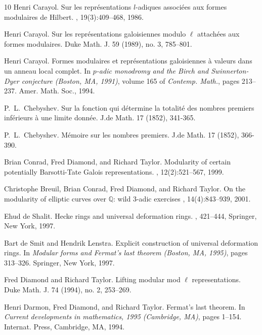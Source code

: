 \documentclass[12pt]{amsart}
\newcommand{\Q}{\mathbb{Q}}
\begin{document}
\begin{thebibliography}{10}
Henri Carayol.
\newblock Sur les repr\'esentations {$l$}-adiques associ\'ees aux formes
  modulaires de {H}ilbert.
, 19(3):409--468, 1986.

Henri Carayol.
\newblock Sur les représentations galoisiennes modulo $\ell$ attachées aux formes modulaires.   
\newblock Duke Math. J.  59  (1989),  no. 3, 785--801.

\bibitem{[C94]}
Henri Carayol.
\newblock Formes modulaires et repr\'esentations galoisiennes \`a valeurs dans
  un anneau local complet.
\newblock In {\em $p$-adic monodromy and the Birch and Swinnerton-Dyer
  conjecture (Boston, MA, 1991)}, volume 165 of {\em Contemp. Math.}, pages
  213--237. Amer. Math. Soc., 1994.


P.~L.~Chebyshev.
\newblock Sur la fonction qui d\'etermine la totalit\'e des nombres premiers inf\'erieurs \`a une limite donn\'ee.
\newblock J.de Math. 17 (1852), 341-365.

P.~L.~Chebyshev.
\newblock M\'emoire sur les nombres premiers.
\newblock J.de Math. 17 (1852), 366-390.


Brian Conrad, Fred Diamond, and Richard Taylor.
\newblock Modularity of certain potentially {B}arsotti-{T}ate {G}alois
  representations.
, 12(2):521--567, 1999.

Christophe Breuil, Brian Conrad, Fred Diamond, and Richard Taylor.
\newblock On the modularity of elliptic curves over $\Q$: wild $3$-adic exercises
, 14(4):843--939, 2001.


Ehud de Shalit.
\newblock Hecke rings and universal deformation rings.
, 421--444, Springer, New York,  1997.

Bart de Smit and Hendrik Lenstra.
\newblock Explicit construction of universal deformation rings.
\newblock In {\em Modular forms and Fermat's last theorem (Boston, MA, 1995)},
  pages 313--326. Springer, New York, 1997.


Fred Diamond and Richard Taylor.
\newblock Lifting modular mod $\ell$ representations.
\newblock Duke Math. J.  74 (1994),  no. 2, 253--269.


\bibitem{[DDT]}
Henri Darmon, Fred Diamond, and Richard Taylor.
\newblock Fermat's last theorem.
\newblock In {\em Current developments in mathematics, 1995 (Cambridge, MA)},
  pages 1--154. Internat. Press, Cambridge, MA, 1994.



\end{thebibliography}
\end{document}
